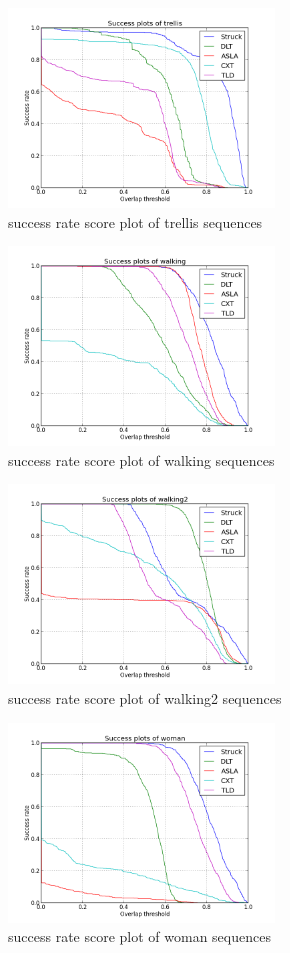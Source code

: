 \documentclass{acm_proc_article-sp}
\begin{document}
\begin{figure}[hbt]
    \includegraphics[width=200pt]{trellis}
    \caption{success rate score plot of trellis sequences}
    \label{fig:trellis}
\end{figure}

\begin{figure}[hbt]
    \includegraphics[width=200pt]{walking}
    \caption{success rate score plot of walking sequences}
    \label{fig:walking}
\end{figure}

\begin{figure}[hbt]
    \includegraphics[width=200pt]{walking2}
    \caption{success rate score plot of walking2 sequences}
    \label{fig:walking2}
\end{figure}

\begin{figure}[hbt]
  \includegraphics[width=200pt]{woman}
  \caption{success rate score plot of woman sequences}
  \label{fig:woman}
\end{figure}
\end{document}
